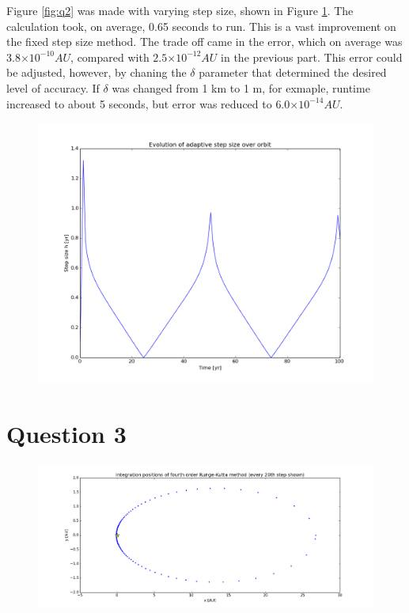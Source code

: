 \documentclass[a4paper,12pt]{article}
\providecommand{\e}[1]{\ensuremath{\times 10^{#1}}}
\begin{document}
Figure \ref{fig:q2} was made with varying step size, shown in Figure \ref{fig:q2i}. The calculation took, on average, 0.65 seconds to run. This is a vast improvement on the fixed step size method. The trade off came in the error, which on average was $3.8\e{-10} AU$, compared with $2.5\e{-12} AU$ in the previous part. This error could be adjusted, however, by chaning the $\delta$ parameter that determined the desired level of accuracy. If $\delta$ was changed from 1 km to 1 m, for exmaple, runtime increased to about 5 seconds, but error was reduced to $6.0\e{-14} AU$.

\begin{figure}[H]
\centering
\includegraphics[width = \linewidth]{lab6q2additional.png}
\caption{}
\label{fig:q2i}
\end{figure}

\section{Question 3}

\begin{figure}[H]
\centering
\includegraphics[width = \linewidth]{lab6q3.png}
\caption{}
\label{fig:q3}
\end{figure}
\end{document}
